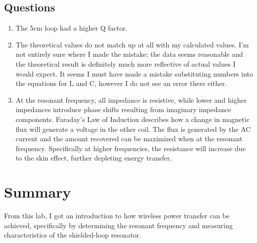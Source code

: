 \documentclass{article}
\begin{document}
\subsection{Questions}

\begin{enumerate}
	\item The 5cm loop had a higher Q factor.
	\item The theoretical values do not match up at all with my calculated values. I'm not entirely sure where I made the mistake; the data seems reasonable and the theoretical result is definitely much more reflective of actual values I would expect. It seems I must have made a mistake substituting numbers into the equations for L and C, however I do not see an error there either.
	\item At the resonant frequency, all impedance is resistive, while lower and higher impedances introduce phase shifts resulting from imaginary impedance components. Faraday's Law of Induction describes how a change in magnetic flux will generate a voltage in the other coil. The flux is generated by the AC current and the amount recovered can be maximized when at the resonant frequency. Specifically at higher frequencies, the resistance will increase due to the skin effect, further depleting energy transfer.
\end{enumerate}

\section{Summary}
From this lab, I got an introduction to how wireless power transfer can be achieved, specifically by determining the resonant frequency and measuring characteristics of the shielded-loop resonator.
\end{document}
